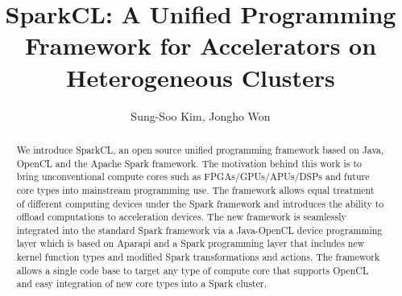 \documentclass[runningheads,a4paper]{llncs}
\begin{document}

\mainmatter  %

\title{SparkCL: A Unified Programming Framework for Accelerators on Heterogeneous Clusters}


%
%
\author{
Sung-Soo Kim, Jongho Won
}

%


%
%

\maketitle


\begin{abstract}
We introduce SparkCL, an open source unified programming framework based on Java, OpenCL and the Apache Spark framework. The motivation behind this work is to bring unconventional compute cores such as FPGAs/GPUs/APUs/DSPs and future core types into mainstream programming use. The framework allows equal treatment of different computing devices under the Spark framework and introduces the ability to offload computations to acceleration devices. The new framework is seamlessly integrated into the standard Spark framework via a Java-OpenCL device programming layer which is based on Aparapi and a Spark programming layer that includes new kernel function types and modified Spark transformations and actions. The framework allows a single code base to target any type of compute core that supports OpenCL and easy integration of new core types into a Spark cluster.

\end{abstract}
\end{document}
